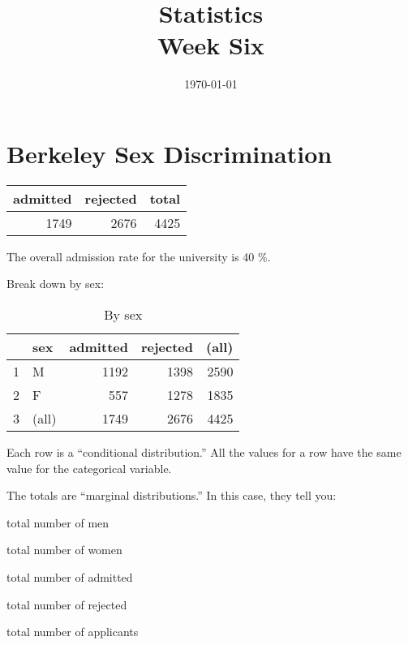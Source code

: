 \documentclass[landscape]{exam}
\title{Statistics \\ Week Six}
\date{\today}
\author{}
\begin{document}
  \maketitle
  \tableofcontents

  \section{Berkeley Sex Discrimination}

  \begin{table}[H]
    \centering
    \begin{tabular}{rrr}
      \toprule
      admitted & rejected & total \\
      \midrule
      1749     & 2676     & 4425 \\
      \bottomrule
    \end{tabular}
  \end{table}

  The overall admission rate for the university is 40 \%.

  Break down by sex:
  \begin{table}[H]
    \centering
    \begin{tabular}{rlrrr}
      \toprule
                & sex   & admitted & rejected & (all) \\
      \midrule
      1         & M     & 1192     & 1398     & 2590 \\
      2         & F     & 557      & 1278     & 1835 \\
      3         & (all) & 1749     & 2676     & 4425 \\
       \bottomrule
    \end{tabular}
    \caption{By sex}
  \end{table}

  Each row is a ``conditional distribution.'' All the values for a row have the
  same value for the categorical variable.

  The totals are ``marginal distributions.'' In this case, they tell you:
  \begin{itemize*}
    \item total number of men
    \item total number of women
    \item total number of admitted
    \item total number of rejected
    \item total number of applicants
  \end{itemize*}
\end{document}
